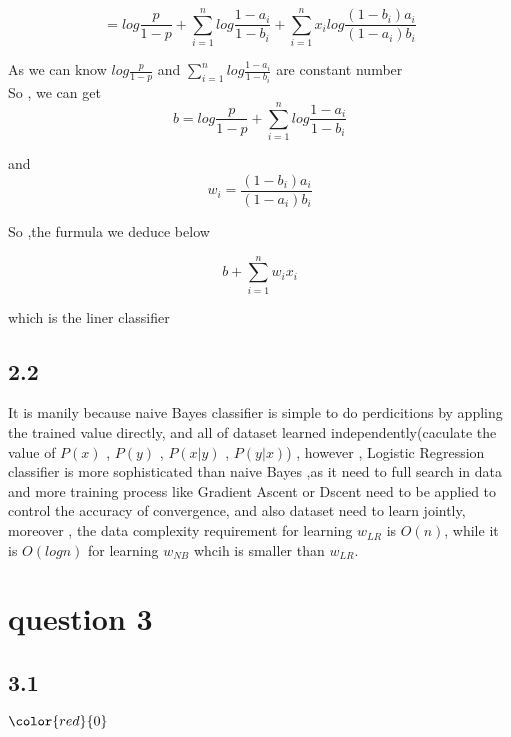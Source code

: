\documentclass[a4paper,12pt]{article}
\begin{document}
$$=log\frac{p}{1-p}+\sum\limits_{i=1}^nlog\frac{1-a_i}{1-b_i} + \sum\limits_{i=1}^nx_ilog\frac{(1-b_i)a_i}{(1-a_i)b_i} $$

As we can know $log\frac{p}{1-p}$ and $\sum\limits_{i=1}^nlog\frac{1-a_i}{1-b_i}$ are constant number\\

So , we can get 
$$b = log\frac{p}{1-p} + \sum\limits_{i=1}^nlog\frac{1-a_i}{1-b_i} $$

and
$$w_i = \frac{(1-b_i)a_i}{(1-a_i)b_i} $$

So ,the furmula we deduce below 

$$b + \sum\limits_{i=1}^n w_i x_i $$

which is the liner classifier\\


\newpage
\subsection*{2.2}
It is manily because naive Bayes classifier is simple to do perdicitions by appling the trained value directly, and all of dataset learned independently(caculate the value of $P(x)$ , $P(y)$  , $P(x|y)$ , $ P(y|x)$) , however , Logistic Regression classifier is more sophisticated than naive Bayes ,as it need to full search in data and more training process like Gradient Ascent or Dscent need to be applied to control the accuracy of convergence, and also dataset need to learn jointly, moreover , the data complexity requirement for learning $w_{LR}$ is $O(n)$, while it is $O(log⁡n)$ for learning $w_{NB}$ whcih is smaller than $w_{LR}$.


\section*{question 3}
\subsection*{3.1}

 $ \color{red}{0} $ 
\end{document}
